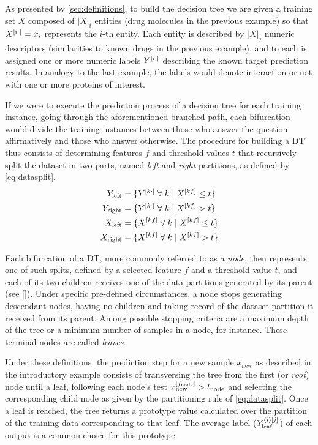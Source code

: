 As presented by \autoref{sec:definitions}, to build the decision tree we are given a training set $X$ composed of $|X|_i$ entities (drug molecules in the previous example) so that $X^{[i\cdot]} = x_i$ represents the $i$-th entity. Each entity is described by $|X|_j$ numeric descriptors (similarities to known drugs in the previous example), and to each is assigned one or more numeric labels $Y^{[i\cdot]}$ describing the known target prediction results. In analogy to the last example, the labels would denote interaction or not with one or more proteins of interest.

If we were to execute the prediction process of a decision tree for each training instance, going through the aforementioned branched path, each bifurcation would divide the training instances between those who answer the question affirmatively and those who answer otherwise.
The procedure for building a DT thus consists of determining features $f$ and threshold values $t$ that recursively split the dataset in two parts, named \emph{left} and \emph{right} partitions, as defined by \autoref{eq:datasplit}.
%
\begin{equation}
    \begin{split} %
        Y_\text{left} &=\{Y\el{k\cdot} \;\forall\; k \mid X\el{kf} \le t\}\\
        Y_\text{right} &=\{Y\el{k\cdot} \;\forall\; k \mid X\el{kf} > t\}\\
        X_\text{left} &=\{X\el{kf} \;\forall\; k \mid X\el{kf} \le t\}\\
        X_\text{right} &=\{X\el{kf} \;\forall\; k \mid X\el{kf} > t\}\\
    \end{split}
    \label{eq:datasplit}
\end{equation}

Each bifurcation of a DT, more commonly referred to as a \emph{node}, then represents one of such splits, defined by a selected feature $f$ and a threshold value $t$, and each of its two children receives one of the data partitions generated by its parent (see \autoref{}). Under specific pre-defined circumstances, a node stops generating descendant nodes, having no children and taking record of the dataset partition it received from its parent. Among possible stopping criteria are a maximum depth of the tree or a minimum number of samples in a node, for instance. These terminal nodes are called \emph{leaves}.

Under these definitions, the prediction step for a new sample $x_\text{new}$ as described in the introductory example consists of transversing the tree from the first (or \emph{root}) node until a leaf, following each node's test $x_\text{new}^{[f_\text{node}]} > t_\text{node}$ and selecting the corresponding child node as given by the partitioning rule of \autoref{eq:datasplit}. Once a leaf is reached, the tree returns a prototype value calculated over the partition of the training data corresponding to that leaf. The average label ($Y_\text{leaf}^{\langle i\rangle [j]}$) of each output is a common choice for this prototype.

